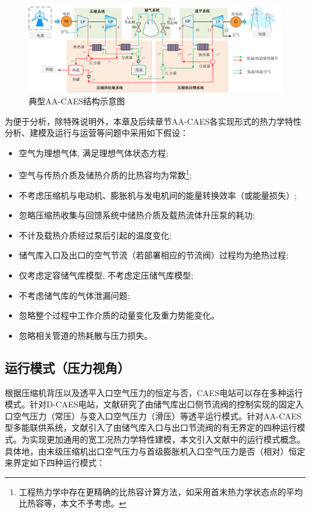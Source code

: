 \begin{figure}[H] %
  \centering
  \includegraphics[scale=0.57]{figures/Chap2-1-AA-CAES-Struc-Thermo.pdf}
  \caption{典型AA-CAES结构示意图}
  \label{fig:CAES-thermal-struc}
\end{figure}

为便于分析，除特殊说明外，本章及后续章节AA-CAES各实现形式的热力学特性分析、建模及运行与运营等问题中采用如下假设：
\begin{itemize}
  \item 空气为理想气体, 满足理想气体状态方程;
  \item 空气与传热介质及储热介质的比热容均为常数\footnote{工程热力学中存在更精确的比热容计算方法，如采用首末热力学状态点的平均比热容等，本文不予考虑。};
  \item 不考虑压缩机与电动机、膨胀机与发电机间的能量转换效率（或能量损失）;
  \item 忽略压缩热收集与回馈系统中储热介质及载热流体升压泵的耗功;
  \item 不计及载热介质经过泵后引起的温度变化;
  \item 储气库入口及出口的空气节流（若部署相应的节流阀）过程均为绝热过程;
  \item 仅考虑定容储气库模型, 不考虑定压储气库模型;
  \item 不考虑储气库的气体泄漏问题;
  \item 忽略整个过程中工作介质的动量变化及重力势能变化。
  \item 忽略相关管道的热耗散与压力损失。
\end{itemize}

\subsection{运行模式（压力视角）}
根据压缩机背压以及透平入口空气压力的恒定与否，CAES电站可以存在多种运行模式。针对D-CAES电站，文献研究了由储气库出口侧节流阀的控制实现的固定入口空气压力（常压）与变入口空气压力（滑压）等透平运行模式。针对AA-CAES型多能联供系统，文献引入了由储气库入口与出口节流阀的有无界定的四种运行模式。为实现更加通用的宽工况热力学特性建模，本文引入文献中的运行模式概念。具体地，由末级压缩机出口空气压力与首级膨胀机入口空气压力是否（相对）恒定来界定如下四种运行模式：

